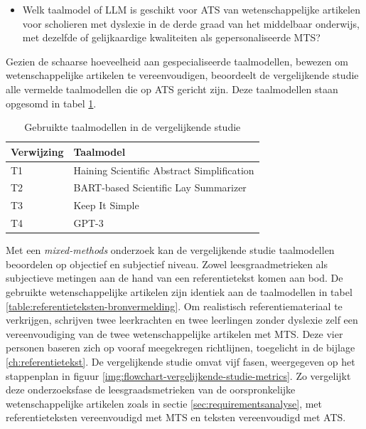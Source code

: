 \begin{itemize}
	\item Welk taalmodel of LLM is geschikt voor ATS van wetenschappelijke artikelen voor scholieren met dyslexie in de derde graad van het middelbaar onderwijs, met dezelfde of gelijkaardige kwaliteiten als gepersonaliseerde MTS?
\end{itemize}

Gezien de schaarse hoeveelheid aan gespecialiseerde taalmodellen, bewezen om wetenschappelijke artikelen te vereenvoudigen, beoordeelt de vergelijkende studie alle vermelde taalmodellen die op ATS gericht zijn. Deze taalmodellen staan opgesomd in tabel \ref{table:vergelijkende-studie-taalmodellen}.

\begin{center}
	\begin{table}[H]
		\begin{tabular}{ | m{4cm} | m{11cm} | } 
			\hline
			\textbf{Verwijzing} & \textbf{Taalmodel} \\
			\hline
			T1 & Haining Scientific Abstract Simplification \\
			\hline
			T2 & BART-based Scientific Lay Summarizer \\
			\hline
			T3 & Keep It Simple\\
			\hline
			T4 & GPT-3 \\
			\hline
		\end{tabular}
		\caption{Gebruikte taalmodellen in de vergelijkende studie}
		\label{table:vergelijkende-studie-taalmodellen}
	\end{table}
\end{center}

Met een \textit{mixed-methods} onderzoek kan de vergelijkende studie taalmodellen beoordelen op objectief en subjectief niveau. Zowel leesgraadmetrieken als subjectieve metingen aan de hand van een referentietekst komen aan bod. De gebruikte wetenschappelijke artikelen zijn identiek aan de taalmodellen in tabel \ref{table:referentieteksten-bronvermelding}. Om realistisch referentiemateriaal te verkrijgen, schrijven twee leerkrachten en twee leerlingen zonder dyslexie zelf een vereenvoudiging van de twee wetenschappelijke artikelen met MTS. Deze vier personen baseren zich op vooraf meegekregen richtlijnen, toegelicht in de bijlage \ref{ch:referentietekst}. De vergelijkende studie omvat vijf fasen, weergegeven op het stappenplan in figuur \ref{img:flowchart-vergelijkende-studie-metrics}. Zo vergelijkt deze onderzoeksfase de leesgraadsmetrieken van de oorspronkelijke wetenschappelijke artikelen zoals in sectie \ref{sec:requirementsanalyse}, met referentieteksten vereenvoudigd met MTS en teksten vereenvoudigd met ATS.  %

